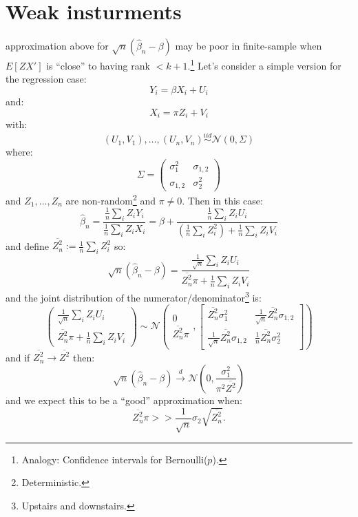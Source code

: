 \documentclass{tufte-book}
\theoremstyle{mytheoremstyle}
\theoremstyle{mylemstyle}
\theoremstyle{mydefstyle}
\begin{document}
\section{Weak insturments}
 approximation above for \(\sqrt{n}(\hat{\beta}_n - \beta)\) may be poor in finite-sample when \(E[ZX']\) is ``close'' to having rank \(< k+1\).\footnote{Analogy: Confidence intervals for Bernoulli(\(p\)).} Let's consider a simple version for the regression case:
	\[Y_i = \beta X_i + U_i\]
and:
	\[X_i = \pi Z_i + V_i\]
with:
	\[(U_1, V_1), \dots, (U_n, V_n) \overset{iid}{\sim} \mathcal{N}(0, \Sigma)\]
where:
	\[\Sigma = \left(\begin{array}{cc} \sigma_1^2 & \sigma_{1,2} \\ \sigma_{1,2} & \sigma_2^2 \end{array} \right)\]
and \(Z_1, \dots, Z_n\) are non-random\footnote{Deterministic.} and \(\pi \ne 0\). Then in this case:
	\[\hat{\beta}_n = \frac{\frac{1}{n} \sum_i Z_i Y_i}{\frac{1}{n} \sum_i Z_i X_i} = \beta + \frac{\frac{1}{n} \sum_i Z_i U_i}{\left(\frac{1}{n}\sum_i Z_i^2\right) + \frac{1}{n} \sum_i Z_i V_i}\]
and define \(\overline{Z_n^2} := \frac{1}{n}\sum_i Z_i^2 \) so:
	\[\sqrt{n}(\hat{\beta}_n - \beta) = \frac{\frac{1}{\sqrt{n}}\sum_i Z_i U_i}{\overline{Z_n^2} \pi + \frac{1}{n} \sum_i Z_i V_i}\]
and the joint distribution of the numerator/denominator\footnote{Upstairs and downstairs.} is:
	\[\left(\begin{array}{c} \frac{1}{\sqrt{n}}\sum_i Z_i U_i \\ \overline{Z_n^2} \pi + \frac{1}{n} \sum_i Z_i V_i \end{array}\right) \sim \mathcal{N}\left(\begin{array}{c} 0 \\ \overline{Z_n^2} \pi \end{array}, \left[\begin{array}{cc} \overline{Z_n^2} \sigma_1^2 & \frac{1}{\sqrt{n}} \overline{Z_n^2} \sigma_{1,2} \\ \frac{1}{\sqrt{n}} \overline{Z_n^2} \sigma_{1,2} & \frac{1}{n} \overline{Z_n^2}\sigma_2^2\end{array}\right] \right)\]
and if \(\overline{Z_n^2} \rightarrow \overline{Z^2}\) then:
	\[\sqrt{n}(\hat{\beta}_n - \beta) \overset{d}{\rightarrow} \mathcal{N}\left(0, \frac{\sigma^2_1}{\pi^2 \overline{Z^2}}\right)\]
and we expect this to be a ``good'' approximation when:
	\[\overline{Z_n^2} \pi >> \frac{1}{\sqrt{n}} \sigma_2 \sqrt{\overline{Z_n^2}}  \text{.}\]
\end{document}
